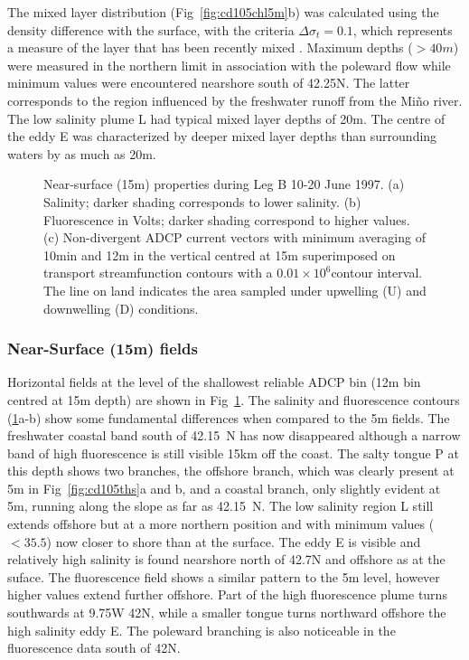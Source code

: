 The mixed layer distribution (Fig~\ref{fig:cd105chl5m}b) was
calculated using the density difference with the surface, with the
criteria $\Delta \sigma_{t}=0.1$\dens, which represents a measure
of the layer that has been recently mixed \citep{brainerd95}.
Maximum depths ($>40m$) were measured in the northern limit in
association with the poleward flow while minimum values were
encountered nearshore south of 42.25\deg N. The latter corresponds
to the region influenced by the freshwater runoff from the
Mi\~{n}o river. The low salinity plume L had typical mixed layer
depths of 20m. The centre of the eddy E was characterized by
deeper mixed layer depths than surrounding waters by as much as
20m.

\begin{figure}[ht]
\begin{widefig}{-.5cm}{-.7cm}
\centering {}%
 
\caption{Near-surface (15m) properties during Leg B 10-20 June
1997. (a) Salinity; darker shading corresponds to lower salinity.
(b) Fluorescence in Volts; darker shading correspond to higher
values. (c) Non-divergent ADCP current vectors with minimum
averaging of 10min and 12m in the vertical centred at 15m
superimposed on transport streamfunction contours with a
$0.01\times 10^{6}$\tra contour interval. The line on land
indicates the area sampled under upwelling (U) and downwelling (D)
conditions.} \label{fig:cd105_15m}
\end{widefig}\end{figure}

\subsubsection{Near-Surface (15m) fields} Horizontal fields at the
level of the shallowest reliable ADCP bin (12m bin centred at 15m
depth) are shown in Fig~\ref{fig:cd105_15m}. The salinity and
fluorescence contours (\ref{fig:cd105_15m}a-b) show some
fundamental differences when compared to the 5m fields. The
freshwater coastal band south of 42.15\deg~N has now disappeared
although a narrow band of high fluorescence is still visible 15km
off the coast. The salty tongue P at this depth shows two
branches, the offshore branch, which was clearly present at 5m in
Fig~\ref{fig:cd105ths}a and b, and a coastal branch, only slightly
evident at 5m, running along the slope as far as 42.15\deg~N. The
low salinity region L still extends offshore but at a more
northern position and with minimum values ($<35.5$) now closer to
shore than at the surface. The eddy E is visible and relatively
high salinity is found nearshore north of 42.7\deg N and offshore
as at the suface. The fluorescence field shows a similar pattern
to the 5m level, however higher values extend further offshore.
Part of the high fluorescence plume turns southwards at 9.75\deg W
42\deg N, while a smaller tongue turns northward offshore the high
salinity eddy E. The poleward branching is also noticeable in the
fluorescence data south of 42\deg N.

